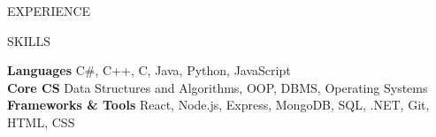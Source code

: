 \documentclass[10pt]{resume}
\begin{document}
\begin{rSection}{EXPERIENCE}


\end{rSection}

\begin{rSection}{SKILLS}

\textbf{Languages}\hspace{0.4cm} C\#, C++, C, Java, Python, JavaScript \\
\textbf{Core CS}\hspace{0.6cm} Data Structures and Algorithms, OOP, DBMS, Operating Systems \\
\textbf{Frameworks \& Tools}\hspace{0.2cm} React, Node.js, Express, MongoDB, SQL, .NET, Git, HTML, CSS

\end{rSection}
\end{document}
